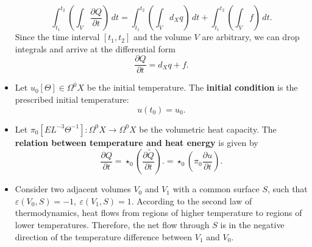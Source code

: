 \begin{discussion}
\begin{itemize}
      \begin{equation}
        \int_{t_1}^{t_2}
          \left(\int_V \frac{\partial Q}{\partial t}\right)\, d t =
          \int_{t_1}^{t_2} \left(\int_V d_X q \right)\, d t
        + \int_{t_1}^{t_2} \left(\int_V f \right)\, d t.
      \end{equation}
      Since the time interval $[t_1, t_2]$ and the volume $V$ are arbitrary,
      we can drop integrals and arrive at the differential form
      \begin{equation}
        \frac{\partial Q}{\partial t} = d_X q + f.
      \end{equation}
    \item
      Let
        $u_0 [\Theta] \in \Omega^0 X$ be the initial temperature.
      The \textbf{initial condition} is the prescribed initial temperature:
      \begin{equation}
        u(t_0) = u_0.
      \end{equation}
    \item
      Let $\pi_0 [E L^{-3} \Theta^{-1}] \colon \Omega^0 X \to \Omega^0 X$
      be the volumetric heat capacity.
      The \textbf{relation between temperature and heat energy} is given by
      \begin{equation}
        \frac{\partial Q}{\partial t}
        = \star_0 \left(\frac{\partial \tilde{Q}}{\partial t}\right).
        = \star_0 \left(\pi_0 \frac{\partial u}{\partial t}\right).
      \end{equation}
    \item
      Consider two adjacent volumes $V_0$ and $V_1$ with a common surface $S$,
      such that $\varepsilon(V_0, S) = -1,\ \varepsilon(V_1, S) = 1$.
      According to the second law of thermodynamics, heat flows from regions of
      higher temperature to regions of lower temperatures.
      Therefore, the net flow through $S$ is in the negative direction of the
      temperature difference between $V_1$ and $V_0$.
      

\end{itemize}
\end{discussion}
